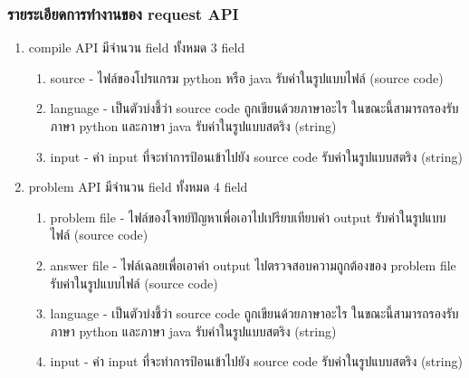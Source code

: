 \subsubsection{รายระเอียดการทำงานของ request API}
\begin{enumerate}
    \item compile API มีจํานวน field ทั้งหมด 3 field
        \begin{enumerate}
            \item source - ไฟล์ของโปรแกรม python หรือ java รับค่าในรูปแบบไฟล์ (source code)
            \item language - เป็นตัวบ่งชี้ว่า source code ถูกเขียนด้วยภาษาอะไร ในขณะนี้สามารถรองรับ
ภาษา python และภาษา java รับค่าในรูปแบบสตริง (string)
            \item input - ค่า input ที่จะทําการป้อนเข้าไปยัง source code รับค่าในรูปแบบสตริง (string)
        \end{enumerate}

    \item problem API มีจํานวน field ทั้งหมด 4 field
        \begin{enumerate}
            \item problem file - ไฟล์ของโจทย์ปัญหาเพื่อเอาไปเปรียบเทียบค่า output รับค่าในรูปแบบไฟล์ (source code)
            \item answer file - ไฟล์เฉลยเพื่อเอาค่า output ไปตรวจสอบความถูกต้องของ problem file รับค่าในรูปแบบไฟล์ (source code)
            \item language - เป็นตัวบ่งชี้ว่า source code ถูกเขียนด้วยภาษาอะไร ในขณะนี้สามารถรองรับ
ภาษา python และภาษา java รับค่าในรูปแบบสตริง (string)
            \item input - ค่า input ที่จะทําการป้อนเข้าไปยัง source code รับค่าในรูปแบบสตริง (string)
        \end{enumerate}
\end{enumerate}

